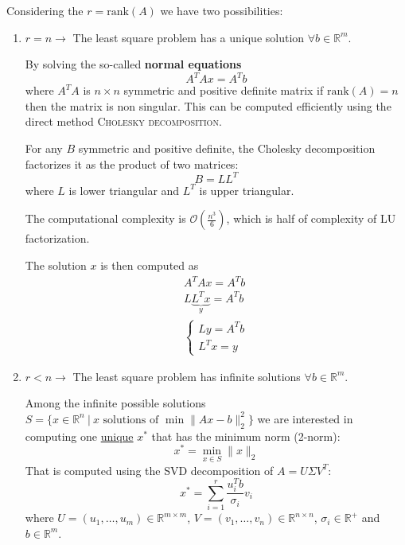 \documentclass{article}
\begin{document}
Considering the $r=\text{rank}(A)$ we have two possibilities:
\begin{enumerate}
    \item $r=n\to$ The least square problem has a unique solution $\forall b\in
        \mathbb{R}^m$.

        By solving the so-called \textbf{normal equations}
        $$A^TAx=A^Tb$$
        where $A^TA$ is $n\times n$ symmetric and positive definite matrix if
        $\text{rank}(A)=n$ then the matrix is non singular. This can be
        computed efficiently using the direct method \textsc{Cholesky
        decomposition}.

        For any $B$ symmetric and positive definite, the Cholesky decomposition
        factorizes it as the product of two matrices:
        $$B=LL^T$$
        where $L$ is lower triangular and $L^T$ is upper triangular.

        The computational complexity is $\mathcal{O}(\frac{n^3}{6})$, which is
        half of complexity of LU factorization.

        The solution $x$ is then computed as
        $$
        \begin{aligned}
            A^TAx=A^Tb\\
            L\underbrace{L^Tx}_{y}=A^Tb\\
            \begin{cases}
                Ly=A^Tb \\ 
                L^Tx=y
            \end{cases}
        \end{aligned}
        $$
    \item $r<n\to$ The least square problem has infinite solutions $\forall
        b\in \mathbb{R}^m$.

        Among the infinite possible solutions $S=\{x\in\mathbb{R}^n\ |\
        x\text{ solutions of } \min\lVert Ax-b\rVert_2^2\}$ we are interested
        in  computing one \underline{unique} $x^*$ that has the minimum norm
        (2-norm): 
        $$x^*=\min_{x\in S}\lVert x \rVert_2$$
        That is computed using the SVD decomposition of $A=U\Sigma V^T$:
        $$x^*=\sum_{i=1}^r\frac{u_i^Tb}{\sigma_i}v_i$$
        where $U=(u_1,\ldots,u_m)\in\mathbb{R}^{m\times m}$,
        $V=(v_1,\ldots,v_n)\in\mathbb{R}^{n\times n}$, $\sigma_i\in\mathbb{R}^+$ and
        $b\in\mathbb{R}^m$.
\end{enumerate}
\end{document}
